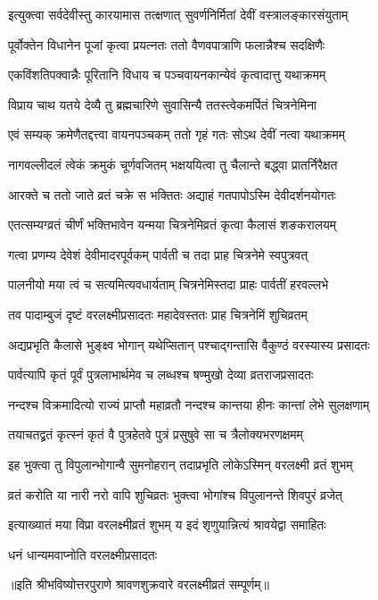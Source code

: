 \twolineshloka
{इत्युक्त्वा सर्वदेवीस्तु कारयामास तत्क्षणात्}
{सुवर्णनिर्मितां देवीं वस्त्रालङ्कारसंयुताम्}%


\twolineshloka
{पूर्वोक्तेन विधानेन पूजां कृत्वा प्रयत्नतः}
{ततो वैणवपात्राणि फलान्नैश्च सदक्षिणैः}%


\twolineshloka
{एकविंशतिपक्वान्नैः पूरितानि विधाय च}
{पञ्चवायनकान्येवं कृत्वादात्तु यथाक्रमम्}%


\twolineshloka
{विप्राय चाथ यतये देव्यै तु ब्रह्मचारिणे}
{सुवासिन्यै ततस्त्वेकमर्पितं चित्रनेमिना}%


\twolineshloka
{एवं सम्यक् क्रमेणैतद्दत्त्वा वायनपञ्चकम्}
{ततो गृहं गतः सोऽथ देवीं नत्वा यथाक्रमम्}%


\twolineshloka
{नागवल्लीदलं त्वेकं क्रमुकं चूर्णवजितम्}
{भक्षययित्वा तु चैलान्ते बद्ध्वा प्रातर्निरैक्षत}%


\twolineshloka
{आरक्ते च ततो जाते व्रतं चक्रे स भक्तितः}
{अद्याहं गतपापोऽस्मि देवीदर्शनयोगतः}%


\twolineshloka
{एतत्सम्यग्व्रतं चीर्णं भक्तिभावेन यन्मया}
{चित्रनेमिव्रतं कृत्वा कैलासं शङकरालयम्}%


\twolineshloka
{गत्वा प्रणम्य देवेशं देवीमादरपूर्वकम्}
{पार्वती च तदा प्राह चित्रनेमे स्वपुत्रवत्}%


\twolineshloka
{पालनीयो मया त्वं च सत्यमित्यवधार्यताम्}
{चित्रनेमिस्तदा प्राहः पार्वतीं हरवल्लभे}%


\twolineshloka
{तव पादाम्बुजं दृष्टं वरलक्ष्मीप्रसादतः}
{महादेवस्ततः प्राह चित्रनेमिं शुचिव्रतम्}%


\twolineshloka
{अद्यप्रभृति कैलासे भुङ्क्ष्व भोगान् यथेप्सितान्}
{पश्चाद्गन्तासि वैकुण्ठं वरस्यास्य प्रसादतः}%


\twolineshloka
{पार्वत्यापि कृतं पूर्वं पुत्रलाभार्थमेव च}
{लब्धश्च षण्मुखो देव्या व्रतराजप्रसादतः}%


\twolineshloka
{नन्दश्च विक्रमादित्यो राज्यं प्राप्तौ महाव्रतौ}
{नन्दश्च कान्तया हीनः कान्तां लेभे सुलक्षणाम्}%


\twolineshloka
{तयाचतद्व्रतं कृत्स्नं कृतं वै पुत्रहेतवे}
{पुत्रं प्रसुषुवे सा च त्रैलोक्यभरणक्षमम्}%


\twolineshloka
{इह भुक्त्वा तु विपुलान्भोगान्वै सुमनोहरान्}
{तदाप्रभृति लोकेऽस्मिन् वरलक्ष्मी व्रतं शुभम्}%


\twolineshloka
{व्रतं करोति या नारी नरो वापि शुचिव्रतः}
{भुक्त्वा भोगांश्च विपुलानन्ते शिवपुरं व्रजेत्}%


\twolineshloka
{इत्याख्यातं मया विप्रा वरलक्ष्मीव्रतं शुभम्}
{य इदं शृणुयान्नित्यं श्रावयेद्वा समाहितः}%

\onelineshloka
{धनं धान्यमवाप्नोति वरलक्ष्मीप्रसादतः}%

॥इति श्रीभविष्योत्तरपुराणे श्रावणशुक्रवारे वरलक्ष्मीव्रतं सम्पूर्णम्॥